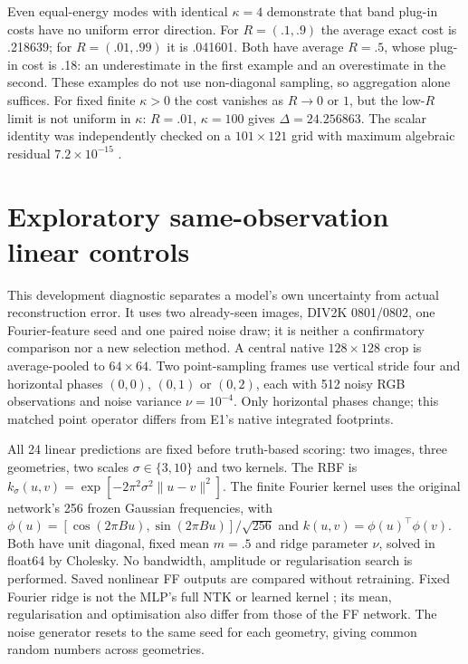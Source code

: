 Even equal-energy modes with identical $\kappa=4$ demonstrate that band
plug-in costs have no uniform error direction. For $R=(.1,.9)$ the average
exact cost is .218639; for $R=(.01,.99)$ it is .041601. Both have average
$R=.5$, whose plug-in cost is .18: an underestimate in the first example
and an overestimate in the second. These examples do not use non-diagonal
sampling, so aggregation alone suffices. For fixed finite $\kappa>0$ the
cost vanishes as $R\to0$ or $1$, but the low-$R$ limit is not uniform in
$\kappa$: $R=.01$, $\kappa=100$ gives $\Delta=24.256863$.
The scalar identity was independently checked on a $101\times121$ grid
with maximum algebraic residual $7.2\times10^{-15}$ .


\section{Exploratory same-observation linear controls}\label{app:controls}
This development diagnostic separates a model's own uncertainty from
actual reconstruction error. It uses two already-seen images, DIV2K
0801/0802, one Fourier-feature seed and one paired noise draw; it is
neither a confirmatory comparison nor a new selection method.
A central native $128\times128$ crop is average-pooled to $64\times64$.
Two point-sampling frames use vertical stride four and horizontal phases
$(0,0)$, $(0,1)$ or $(0,2)$, each with 512 noisy RGB observations and
noise variance $\nu=10^{-4}$. Only horizontal phases change; this matched
point operator differs from E1's native integrated footprints.

All 24 linear predictions are fixed before truth-based scoring: two
images, three geometries, two scales $\sigma\in\{3,10\}$ and two kernels.
The RBF is $k_\sigma(u,v)=\exp[-2\pi^2\sigma^2\|u-v\|^2]$. The finite
Fourier kernel uses the original network's 256 frozen Gaussian frequencies,
with $\phi(u)=[\cos(2\pi Bu),\sin(2\pi Bu)]/\sqrt{256}$ and
$k(u,v)=\phi(u)^\top\phi(v)$. Both have unit diagonal, fixed mean $m=.5$
and ridge parameter $\nu$, solved in float64 by Cholesky. No bandwidth,
amplitude or regularisation search is performed. Saved nonlinear FF
outputs are compared without retraining. Fixed Fourier ridge is not the
MLP's full NTK or learned kernel \citep{tancik2020fourier}; its mean,
regularisation and optimisation also differ from those of the FF network.
The noise generator resets to the same seed for each geometry, giving
common random numbers across geometries.

